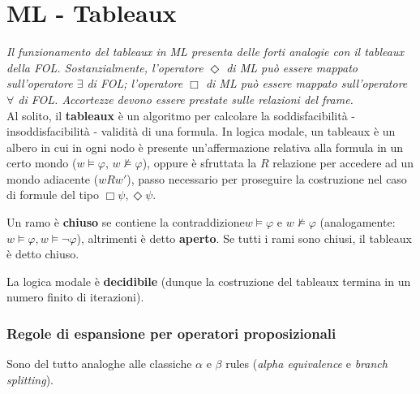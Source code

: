 \chapter{ML - Tableaux}

\textit{Il funzionamento del tableaux in ML presenta delle forti analogie con il tableaux della FOL. Sostanzialmente, l'operatore $\Diamond$ di ML può essere mappato sull'operatore $\exists$ di FOL; l'operatore $\Box$ di ML può essere mappato sull'operatore $\forall$ di FOL. Accortezze devono essere prestate sulle relazioni del frame.}
\\

Al solito, il \textbf{tableaux} è un algoritmo per calcolare la soddisfacibilità - insoddisfacibilità - validità di una formula. In logica modale, un tableaux è un albero in cui in ogni nodo è presente un'affermazione relativa alla formula in un certo mondo ($w \models \varphi$, $w \not\models \varphi$), oppure è sfruttata la $R$ relazione per accedere ad un mondo adiacente ($wRw'$), passo necessario per proseguire la costruzione nel caso di formule del tipo $\Box \psi, \Diamond \psi$.

Un ramo è \textbf{chiuso} se contiene la contraddizione$w \models \varphi$ e $w \not \models \varphi$ (analogamente: $w \models \varphi, w \models \lnot \varphi$), altrimenti è detto \textbf{aperto}. Se tutti i rami sono chiusi, il tableaux è detto chiuso.

La logica modale è \textbf{decidibile} (dunque la costruzione del tableaux termina in un numero finito di iterazioni).

\subsection{Regole di espansione per operatori proposizionali}
Sono del tutto analoghe alle classiche $\alpha$ e $\beta$ rules (\textit{alpha equivalence} e \textit{branch splitting}).


